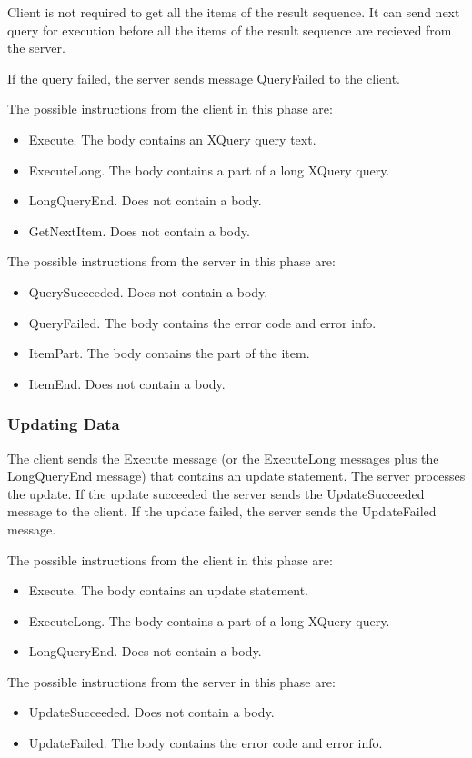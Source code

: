 \documentclass[a4paper,12pt]{article}
\begin{document}
Client is not required to get all the items of the result sequence. It can send next query for execution before all the items of the result sequence are recieved from the server.
 
If the query failed, the server sends message QueryFailed to the client.

The possible instructions from the client in this phase are:
\begin{itemize} 
\item Execute. The body contains an XQuery query text.
\item ExecuteLong. The body contains a part of a long XQuery query.
\item LongQueryEnd. Does not contain a body.
\item GetNextItem. Does not contain a body.
\end{itemize}

The possible instructions from the server in this phase are:
\begin{itemize} 
\item QuerySucceeded. Does not contain a body.
\item QueryFailed. The body contains the error code and error info.
\item ItemPart. The body contains the part of the item.
\item ItemEnd. Does not contain a body.
\end{itemize}

\subsubsection{Updating Data}

The client sends the Execute message (or the ExecuteLong messages plus the LongQueryEnd message) that contains an update statement. The server processes the update. If the update succeeded the server sends the UpdateSucceeded message to the client. If the update failed, the server sends the UpdateFailed message.

The possible instructions from the client in this phase are:
\begin{itemize}
\item Execute. The body contains an update statement.
\item ExecuteLong. The body contains a part of a long XQuery query.
\item LongQueryEnd. Does not contain a body.
\end{itemize}

The possible instructions from the server in this phase are:
\begin{itemize}
\item UpdateSucceeded. Does not contain a body.
\item UpdateFailed. The body contains the error code and error info.
\end{itemize}
\end{document}
